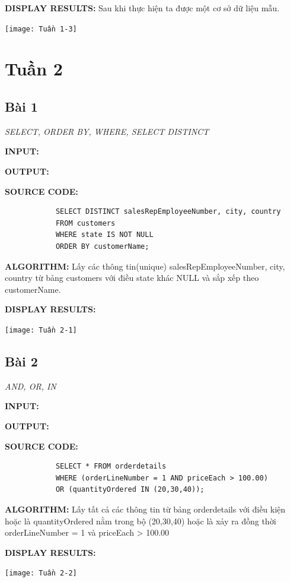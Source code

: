 \documentclass[12pt,a4paper]{report}
\begin{document}
	{\bf DISPLAY RESULTS:} Sau khi thực hiện ta được một cơ sở dữ liệu mẫu.
		\vskip 0.2cm
		\begin{center}
			\texttt{[image: Tuần 1-3]}
		\end{center}

\newpage
\section{Tuần 2}
\subsection{Bài 1}
	\begin{center}
		{\it SELECT, ORDER BY, WHERE, SELECT DISTINCT}
	\end{center}
	
	{\bf INPUT:}
	
	
	{\bf OUTPUT:}
	
	
	{\bf SOURCE CODE:}
		\begin{lstlisting}
			SELECT DISTINCT salesRepEmployeeNumber, city, country
			FROM customers
			WHERE state IS NOT NULL
			ORDER BY customerName;
		\end{lstlisting}
	
	
	{\bf ALGORITHM:}
		Lấy các thông tin(unique) salesRepEmployeeNumber, city, country từ bảng customers với điều state khác NULL và sắp xếp theo customerName.
	
	{\bf DISPLAY RESULTS:}
		\begin{center}
			\texttt{[image: Tuần 2-1]}
		\end{center}
\subsection{Bài 2}
	\begin{center}
		{\it AND, OR, IN}
	\end{center}		
	
	{\bf INPUT:}
	
	{\bf OUTPUT:}
	
	{\bf SOURCE CODE:}
		\begin{lstlisting}
			SELECT * FROM orderdetails
			WHERE (orderLineNumber = 1 AND priceEach > 100.00)
			OR (quantityOrdered IN (20,30,40));
		\end{lstlisting}
	{\bf ALGORITHM:}
		Lấy tất cả các thông tin từ bảng orderdetails với điều kiện hoặc là quantityOrdered nằm trong bộ (20,30,40) hoặc là xảy ra đồng thời orderLineNumber = 1 và priceEach > 100.00
	
	{\bf DISPLAY RESULTS:}
		\begin{center}
			\texttt{[image: Tuần 2-2]}
		\end{center}
\end{document}
